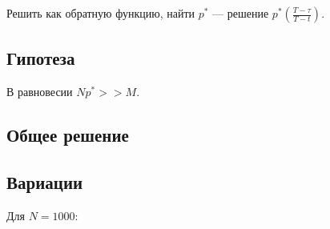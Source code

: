 Решить как обратную функцию, найти $p^*$ — решение $p^*(\frac{T-\tau}{T-t})$.

\subsection{Гипотеза}
В равновесии $Np^* >> M$.

\subsection{Общее решение}


\subsection{Вариации}

Для $N=1000$:

